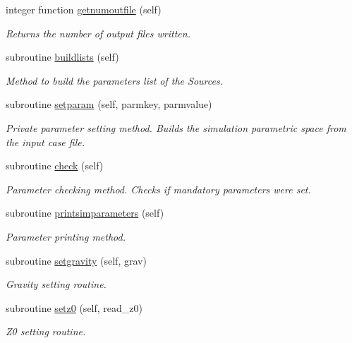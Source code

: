 \begin{DoxyCompactItemize}
integer function \mbox{\hyperlink{namespacesimulationglobals__mod_a2b76dc3e6cbf1256253c54903df8393b}{getnumoutfile}} (self)
\begin{DoxyCompactList}\small\item\em Returns the number of output files written. \end{DoxyCompactList}\item 
subroutine \mbox{\hyperlink{namespacesimulationglobals__mod_a20a4476e2a8dbec4c1aaa202a14b4a40}{buildlists}} (self)
\begin{DoxyCompactList}\small\item\em Method to build the parameters list of the Sources. \end{DoxyCompactList}\item 
subroutine \mbox{\hyperlink{namespacesimulationglobals__mod_ada0b6ffc5e112afbd86cdaa8d9aa55d8}{setparam}} (self, parmkey, parmvalue)
\begin{DoxyCompactList}\small\item\em Private parameter setting method. Builds the simulation parametric space from the input case file. \end{DoxyCompactList}\item 
subroutine \mbox{\hyperlink{namespacesimulationglobals__mod_a3d337e9c28136dd9c67fa576f05cd44b}{check}} (self)
\begin{DoxyCompactList}\small\item\em Parameter checking method. Checks if mandatory parameters were set. \end{DoxyCompactList}\item 
subroutine \mbox{\hyperlink{namespacesimulationglobals__mod_ab67964fe7c3fb20a4ce0b4193520aa1d}{printsimparameters}} (self)
\begin{DoxyCompactList}\small\item\em Parameter printing method. \end{DoxyCompactList}\item 
subroutine \mbox{\hyperlink{namespacesimulationglobals__mod_ae6b88d15ddc389aedd73d600de0337df}{setgravity}} (self, grav)
\begin{DoxyCompactList}\small\item\em Gravity setting routine. \end{DoxyCompactList}\item 
subroutine \mbox{\hyperlink{namespacesimulationglobals__mod_a36c2833caae3767434115cc966fe2c5d}{setz0}} (self, read\+\_\+z0)
\begin{DoxyCompactList}\small\item\em Z0 setting routine. \end{DoxyCompactList}\item 

\end{DoxyCompactItemize}
